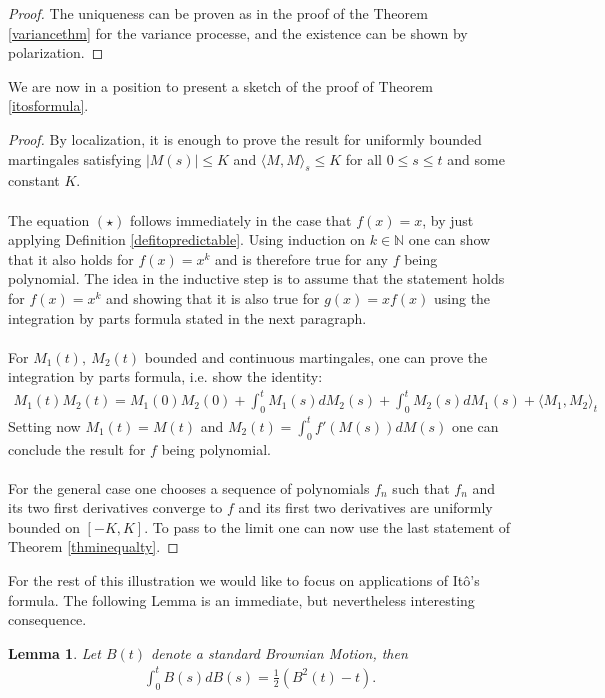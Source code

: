 \documentclass[11pt,a4paper, final]{article}
\newtheorem{lem}{Lemma}[section]
\begin{document}
\begin{proof}
The uniqueness can be proven as in the proof of the Theorem \ref{variancethm} for the variance processe, and the existence can be shown by polarization.
\end{proof}
\noindent We are now in a position to present a sketch of the proof of Theorem \ref{itosformula}.
\begin{proof}
By localization, it is enough to prove the result for uniformly bounded martingales satisfying $\lvert M(s) \rvert \leq K$ and $\langle M,M\rangle_s\leq K$ for all $0\leq s \leq t$ and some constant $K$.\\
\\
The equation $(\star)$ follows immediately in the case that $f(x)=x$, by just applying Definition \ref{defitopredictable}.
Using induction on $k \in \mathbb{N}$ one can show that it also holds for $f(x)=x^k$ and is therefore true for any $f$ being polynomial.
The idea in the inductive step is to assume that the statement holds for $f(x)=x^k$ and showing that it is also true for $g(x)=x f(x)$ using the integration by parts formula stated in the next paragraph.
\\\\
For $M_1(t), \ M_2(t)$ bounded and continuous martingales, one can prove the integration by parts formula, i.e. show the identity:
\begin{align*}
M_1(t) M_2(t)=M_1(0) M_2(0) + \int_0^t M_1(s) dM_2(s) + \int_0^t M_2(s) dM_1(s) + \langle M_1,M_2\rangle_t
\end{align*}
\noindent Setting now $M_1(t)=M(t)$ and $M_2(t)= \int_0^t f'(M(s)) dM(s)$ one can conclude the result for $f$ being polynomial.\\
\\
For the general case one chooses a sequence of polynomials $f_n$ such that $f_n$ and its two first derivatives converge to $f$ and its first two derivatives are uniformly bounded on $[-K,K]$. %
To pass to the limit one can now use the last statement of Theorem \ref{thminequalty}.
\end{proof}
\noindent For the rest of this illustration we would like to focus on applications of Itô's formula. The following Lemma is an immediate, but nevertheless interesting consequence.
\begin{lem} Let $B(t)$ denote a standard Brownian Motion, then 
\begin{align*}
\int_0^t B(s) dB(s) = \frac{1}{2}( B^2(t)-t).
\end{align*}
\end{lem}
\end{document}
